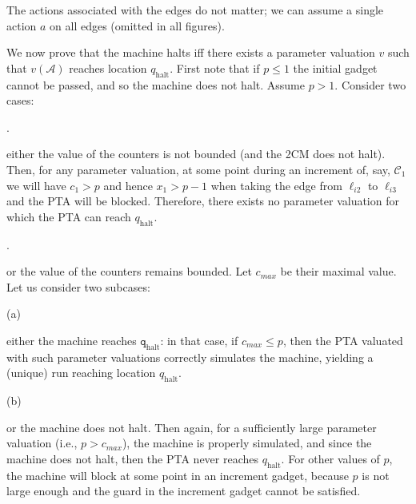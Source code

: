 \documentclass[10pt,a4paper]{article}
\begin{document}
 
The actions associated with the edges do not matter; we can assume a single action $a$ on all edges (omitted in all figures).\par
 
 
 
We now prove that the machine halts iff there exists a parameter valuation $v$ such that $v(\mathcal{A})$ reaches location $q_{\textrm{halt}}$. First note that if $p\leq 1$ the initial gadget cannot be passed, and so the machine does not halt. Assume $p>1$. Consider two cases:\par
  
\par{}. 
 
either the value of the counters is not bounded (and the 2CM does not halt). Then, for any parameter valuation, at some point during an increment of, say, $\mathcal{C}_{1}$ we will have $c_{1}>p$ and hence $x_{1}>p-1$ when taking the edge from $\mathrm{\mathrm{\ell}}_{i2}$ to $\mathrm{\mathrm{\ell}}_{i3}$ and the PTA will be blocked. Therefore, there exists no parameter valuation for which the PTA can reach $q_{\textrm{halt}}$.\par
 
 
 
\par{}. 
 
or the value of the counters remains bounded. Let $c_{\mathit{max}}$ be their maximal value. Let us consider two subcases:\par
  
\par\noindent  (a) 
 
either the machine reaches $\mathtt{q}_{\textrm{halt}}$: in that case, if $c_{\mathit{max}}\leq p$, then the PTA valuated with such parameter valuations correctly simulates the machine, yielding a (unique) run reaching location $q_{\textrm{halt}}$.\par
 
 
 
\par\noindent  (b) 
 
or the machine does not halt. Then again, for a sufficiently large parameter valuation (i.e., $p>c_{\mathit{max}}$), the machine is properly simulated, and since the machine does not halt, then the PTA never reaches $q_{\textrm{halt}}$. For other values of $p$, the machine will block at some point in an increment gadget, because $p$ is not large enough and the guard in the increment gadget cannot be satisfied.\par
 
\end{document}
